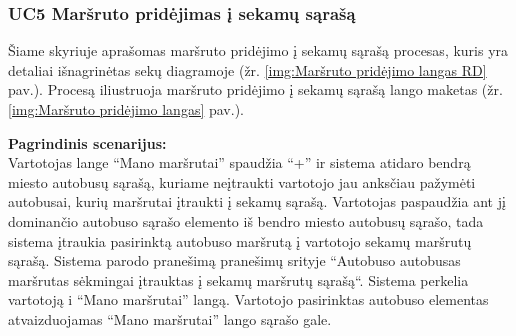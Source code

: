 \documentclass{VUMIFPSkursinis}
\begin{document}
\subsubsection{UC5 Maršruto pridėjimas į sekamų sąrašą}
	Šiame skyriuje aprašomas maršruto pridėjimo į sekamų sąrašą procesas,  kuris yra detaliai išnagrinėtas sekų diagramoje (žr. \ref{img:Maršruto pridėjimo langas RD} pav.). 
	Procesą iliustruoja maršruto pridėjimo į sekamų sąrašą lango maketas (žr. \ref{img:Maršruto pridėjimo langas} pav.).
	
	\textbf{Pagrindinis scenarijus:}\\
	Vartotojas lange “Mano maršrutai” spaudžia “+” ir sistema atidaro bendrą miesto autobusų sąrašą, kuriame neįtraukti 
	vartotojo jau anksčiau pažymėti autobusai, kurių maršrutai įtraukti į sekamų sąrašą. Vartotojas paspaudžia ant jį 
	dominančio autobuso sąrašo elemento iš bendro miesto autobusų sąrašo, tada sistema įtraukia pasirinktą autobuso maršrutą 
	į vartotojo sekamų maršrutų sąrašą. Sistema parodo pranešimą pranešimų srityje “Autobuso {autobusas} maršrutas sėkmingai 
	įtrauktas į sekamų maršrutų sąrašą“. Sistema perkelia vartotoją i “Mano maršrutai” langą. Vartotojo pasirinktas autobuso 
	elementas atvaizduojamas “Mano maršrutai” lango sąrašo gale.
\end{document}
